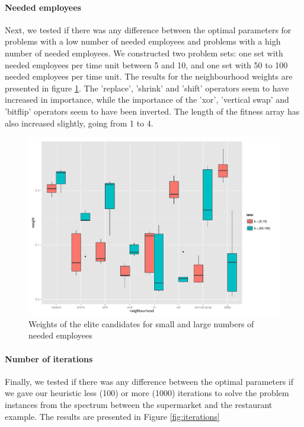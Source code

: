 \documentclass[]{article}
\begin{document}
\paragraph{Needed employees}
Next, we tested if there was any difference between the optimal parameters for problems with a low number of needed employees and problems with a high number of needed employees.
We constructed two problem sets: one set with needed employees per time unit between 5 and 10, and one set with 50 to 100 needed employees per time unit. The results for the neighbourhood weights are presented in figure \ref{fig:b}. The 'replace', 'shrink' and 'shift' operators seem to have increased in importance, while the importance of the 'xor', 'vertical swap' and 'bitflip' operators seem to have been inverted. The length of the fitness array has also increased slightly, going from 1 to 4.

\begin{figure}
	\includegraphics[width=\textwidth]{boxplot_b.pdf}
	\caption{Weights of the elite candidates for small and large numbers of needed employees}
	\label{fig:b}
\end{figure}

\paragraph{Number of iterations}
Finally, we tested if there was any difference between the optimal parameters if we gave our heuristic less (100) or more (1000) iterations to solve the problem instances from the spectrum between the supermarket and the restaurant example. The results are presented in Figure \ref{fig:iterations}
\end{document}
